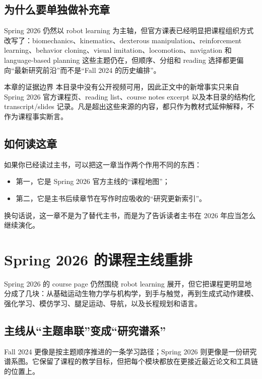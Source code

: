 \documentclass[a4paper]{article}
\begin{document}
\subsection{为什么要单独做补充章}

Spring 2026 仍然以 robot learning 为主轴，但官方课表已经明显把课程组织方式改写了：biomechanics、kinematics、dexterous manipulation、reinforcement learning、behavior cloning、visual imitation、locomotion、navigation 和 language-based planning 这些主题仍在，但顺序、分组和 reading 选择都更偏向“最新研究前沿”而不是“Fall 2024 的历史编排”。

\begin{warningbox}{本章的证据边界}
本目录中没有公开视频可用，因此正文中的新增事实只来自 Spring 2026 官方课程页、reading list、course notes excerpt 以及本目录的结构化 transcript/slides 记录。凡是超出这些来源的内容，都只作为教材式延伸解释，不作为课程事实断言。
\end{warningbox}

\subsection{如何读这章}

如果你已经读过主书，可以把这一章当作两个作用不同的东西：
\begin{itemize}
  \item 第一，它是 Spring 2026 官方主线的“课程地图”；
  \item 第二，它是主书后续章节在写作时应吸收的“研究更新索引”。
\end{itemize}

换句话说，这一章不是为了替代主书，而是为了告诉读者主书在 2026 年应当怎么继续演化。

\section{Spring 2026 的课程主线重排}

Spring 2026 的 course page 仍然围绕 robot learning 展开，但它把课程更明显地分成了几块：从基础运动生物力学与机构学，到手与触觉，再到生成式动作建模、强化学习、模仿学习、腿足运动、导航，以及长程规划和语言。

\subsection{主线从“主题串联”变成“研究谱系”}

Fall 2024 更像是按主题顺序推进的一条学习路径；Spring 2026 则更像是一份研究谱系图。它保留了课程的教学目标，但把每个模块都放在更接近最近论文和工具链的位置上。
\end{document}
